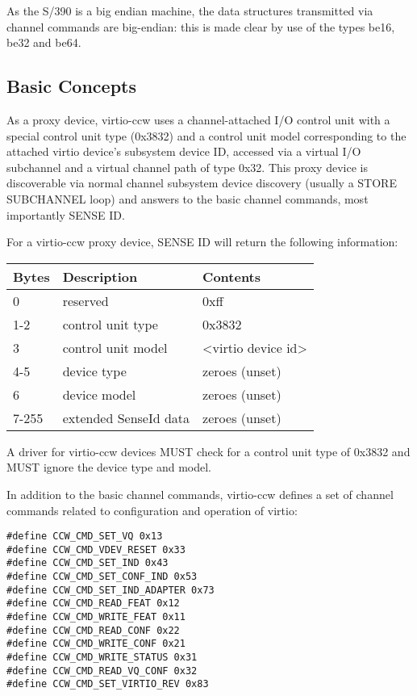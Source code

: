 As the S/390 is a big endian machine, the data structures transmitted
via channel commands are big-endian: this is made clear by use of
the types be16, be32 and be64.

\subsection{Basic Concepts}\label{sec:Virtio Transport Options / Virtio over channel I/O / Basic Concepts}

As a proxy device, virtio-ccw uses a channel-attached I/O control
unit with a special control unit type (0x3832) and a control unit
model corresponding to the attached virtio device's subsystem
device ID, accessed via a virtual I/O subchannel and a virtual
channel path of type 0x32. This proxy device is discoverable via
normal channel subsystem device discovery (usually a STORE
SUBCHANNEL loop) and answers to the basic channel commands, most
importantly SENSE ID.

For a virtio-ccw proxy device, SENSE ID will return the following
information:

\begin{tabular}{ |l|l|l| }
\hline
Bytes & Description & Contents \\
\hline \hline
0     & reserved              & 0xff \\
\hline
1-2   & control unit type     & 0x3832 \\
\hline
3     & control unit model    & <virtio device id> \\
\hline
4-5   & device type           & zeroes (unset) \\
\hline
6     & device model          & zeroes (unset) \\
\hline
7-255 & extended SenseId data & zeroes (unset) \\
\hline
\end{tabular}

A driver for virtio-ccw devices MUST check for a control unit
type of 0x3832 and MUST ignore the device type and model.

In addition to the basic channel commands, virtio-ccw defines a
set of channel commands related to configuration and operation of
virtio:

\begin{lstlisting}
#define CCW_CMD_SET_VQ 0x13
#define CCW_CMD_VDEV_RESET 0x33
#define CCW_CMD_SET_IND 0x43
#define CCW_CMD_SET_CONF_IND 0x53
#define CCW_CMD_SET_IND_ADAPTER 0x73
#define CCW_CMD_READ_FEAT 0x12
#define CCW_CMD_WRITE_FEAT 0x11
#define CCW_CMD_READ_CONF 0x22
#define CCW_CMD_WRITE_CONF 0x21
#define CCW_CMD_WRITE_STATUS 0x31
#define CCW_CMD_READ_VQ_CONF 0x32
#define CCW_CMD_SET_VIRTIO_REV 0x83
\end{lstlisting}

